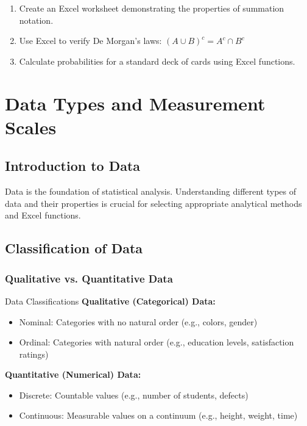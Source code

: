 \documentclass[12pt,a4paper]{book}
\begin{document}
\begin{enumerate}
    \item Create an Excel worksheet demonstrating the properties of summation notation.
    \item Use Excel to verify De Morgan's laws: $(A \cup B)^c = A^c \cap B^c$
    \item Calculate probabilities for a standard deck of cards using Excel functions.
\end{enumerate}

\chapter{Data Types and Measurement Scales}

\section{Introduction to Data}

Data is the foundation of statistical analysis. Understanding different types of data and their properties is crucial for selecting appropriate analytical methods and Excel functions.

\section{Classification of Data}

\subsection{Qualitative vs. Quantitative Data}

\begin{definition}{Data Classifications}
\textbf{Qualitative (Categorical) Data:}
\begin{itemize}
    \item Nominal: Categories with no natural order (e.g., colors, gender)
    \item Ordinal: Categories with natural order (e.g., education levels, satisfaction ratings)
\end{itemize}

\textbf{Quantitative (Numerical) Data:}
\begin{itemize}
    \item Discrete: Countable values (e.g., number of students, defects)
    \item Continuous: Measurable values on a continuum (e.g., height, weight, time)
\end{itemize}
\end{definition}
\end{document}

